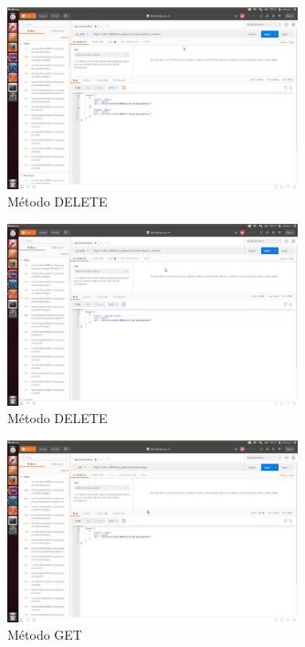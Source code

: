 \documentclass[12pt,a4paper, spanish]{article}
\begin{document}
\begin{figure}[H]
	\centering
	\includegraphics[width=0.75\textwidth]{images/captura18.jpg}
	\caption{Método DELETE}
\end{figure}

\begin{figure}[H]
	\centering
	\includegraphics[width=0.75\textwidth]{images/captura19.jpg}
	\caption{Método DELETE}
\end{figure}

\begin{figure}[H]
	\centering
	\includegraphics[width=0.75\textwidth]{images/captura20.jpg}
	\caption{Método GET}
\end{figure}
\end{document}

